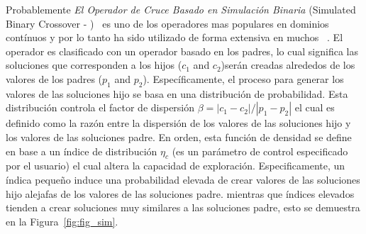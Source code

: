 Probablemente \textit{El Operador de Cruce Basado en Simulación Binaria} (Simulated Binary Crossover - \SBX{})~\cite{deb1994simulated} es uno de los operadores mas populares en dominios contínuos y por lo tanto ha sido utilizado de forma extensiva en muchos \MOEAS{}~\cite{Joel:NSGAII,Joel:SMSEMOA}.
%
El operador \SBX{} es clasificado con un operador basado en los padres, lo cual significa las soluciones que corresponden a los hijos ($c_1$ and $c_2$)serán creadas alrededos de los valores de los padres ($p_1$ and $p_2$).
%
Específicamente, el proceso para generar los valores de las soluciones hijo se basa en una distribución de probabilidad.
%
Esta distribución controla el factor de dispersión $\beta = |c_1 - c_2 | / |p_1 - p_2|$ el cual es definido como la razón entre la dispersión de los valores de las soluciones hijo y los valores de las soluciones padre.
%
En orden, esta función de densidad se define en base a un índice de distribución $\eta_c$ (es un parámetro de control especificado por el usuario) el cual altera la capacidad de exploración.
%
Especificamente, un índica pequeño induce una probabilidad elevada de crear valores de las soluciones hijo alejafas de los valores de las soluciones padre.
mientras que índices elevados tienden a crear soluciones muy similares a las soluciones padre, esto se demuestra en la Figura~\ref{fig:fig_sim}.
%

